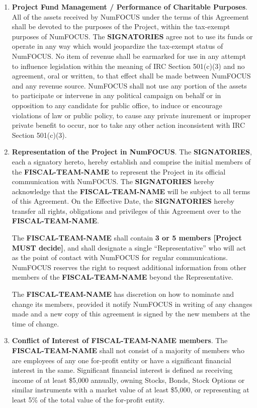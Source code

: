 \documentclass[english,letterpaper,12pt]{article}
\newcommand{\signatories}{\textbf{SIGNATORIES}}
\newcommand{\fiscalteam}{\textbf{FISCAL-TEAM-NAME}}
\newcommand{\teamsize}{\textbf{3 or 5 members [Project MUST decide]}}
\begin{document}
\begin{enumerate}[label=\arabic*.,ref=\S~\arabic*]
  
\item \textbf{Project Fund Management / Performance of Charitable
  Purposes}. \label{CharitablePurpose} All of the assets received by NumFOCUS
  under the terms of this Agreement shall be devoted to the purposes of the
  Project, within the tax-exempt purposes of NumFOCUS. The \signatories{} agree
  not to use its funds or operate in any way which would jeopardize the
  tax-exempt status of NumFOCUS. No item of revenue shall be earmarked for use
  in any attempt to influence legislation within the meaning of IRC Section
  501(c)(3) and no agreement, oral or written, to that effect shall be made
  between NumFOCUS and any revenue source. NumFOCUS shall not use any portion
  of the assets to participate or intervene in any political campaign on behalf
  or in opposition to any candidate for public office, to induce or encourage
  violations of law or public policy, to cause any private inurement or
  improper private benefit to occur, nor to take any other action inconsistent
  with IRC Section 501(c)(3).

\item \textbf{Representation of the Project in
  NumFOCUS}. \label{Representation}The \signatories{}, each a signatory hereto,
  hereby establish and comprise the initial members of the \fiscalteam{} to
  represent the Project in its official communication with NumFOCUS.  The
  \signatories{} hereby acknowledge that the \fiscalteam{} will be subject
  to all terms of this Agreement.  On the Effective Date, the \signatories{}
  hereby transfer all rights, obligations and privileges of this Agreement over
  to the \fiscalteam{}.

  The \fiscalteam{} shall contain \teamsize{}, and shall designate a single
  ``Representative'' who will act as the point of contact with NumFOCUS for
  regular communications.  NumFOCUS reserves the right to request additional
  information from other members of the \fiscalteam{} beyond the
  Representative.

  The \fiscalteam{} has discretion on how to nominate and change its
  members, provided it notify NumFOCUS in writing of any changes made and a new
  copy of this agreement is signed by the new members at the time of change.

\item \textbf{Conflict of Interest of \fiscalteam{} members}. The \fiscalteam{}
  shall not consist of a majority of members who are employees of any one
  for-profit entity or have a significant financial interest in the same.
  Significant financial interest is defined as receiving income of at least
  \$5,000 annually, owning Stocks, Bonds, Stock Options or similar instruments
  with a market value of at least \$5,000, or representing at least 5\% of the
  total value of the for-profit entity.


\end{enumerate}
\end{document}
